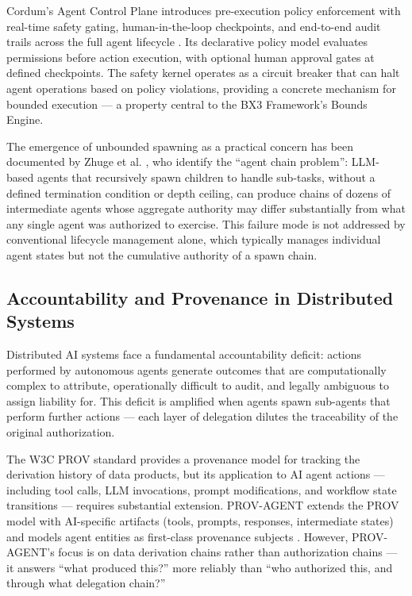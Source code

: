 Cordum's Agent Control Plane introduces pre-execution policy enforcement with real-time safety gating, human-in-the-loop checkpoints, and end-to-end audit trails across the full agent lifecycle \cite{cordum2025}. Its declarative policy model evaluates permissions before action execution, with optional human approval gates at defined checkpoints. The safety kernel operates as a circuit breaker that can halt agent operations based on policy violations, providing a concrete mechanism for bounded execution — a property central to the BX3 Framework's Bounds Engine.

The emergence of unbounded spawning as a practical concern has been documented by Zhuge et al. \cite{zhuge2024}, who identify the ``agent chain problem'': LLM-based agents that recursively spawn children to handle sub-tasks, without a defined termination condition or depth ceiling, can produce chains of dozens of intermediate agents whose aggregate authority may differ substantially from what any single agent was authorized to exercise. This failure mode is not addressed by conventional lifecycle management alone, which typically manages individual agent states but not the cumulative authority of a spawn chain.

\subsection{Accountability and Provenance in Distributed Systems}

Distributed AI systems face a fundamental accountability deficit: actions performed by autonomous agents generate outcomes that are computationally complex to attribute, operationally difficult to audit, and legally ambiguous to assign liability for. This deficit is amplified when agents spawn sub-agents that perform further actions — each layer of delegation dilutes the traceability of the original authorization.

The W3C PROV standard provides a provenance model for tracking the derivation history of data products, but its application to AI agent actions — including tool calls, LLM invocations, prompt modifications, and workflow state transitions — requires substantial extension. PROV-AGENT extends the PROV model with AI-specific artifacts (tools, prompts, responses, intermediate states) and models agent entities as first-class provenance subjects \cite{dzone2025accountability}. However, PROV-AGENT's focus is on data derivation chains rather than authorization chains — it answers ``what produced this?'' more reliably than ``who authorized this, and through what delegation chain?''

